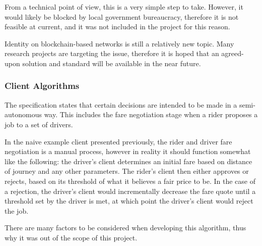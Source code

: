 From a technical point of view, this is a very simple step to take. However, it would likely be blocked by local government bureaucracy, therefore it is not feasible at current, and it was not included in the project for this reason.

Identity on blockchain-based networks is still a relatively new topic. Many research projects are targeting the issue, therefore it is hoped that an agreed-upon solution and standard will be available in the near future.

\subsubsection{Client Algorithms}

The specification states that certain decisions are intended to be made in a semi-autonomous way. This includes the fare negotiation stage when a rider proposes a job to a set of drivers.

In the naive example client presented previously, the rider and driver fare negotiation is a manual process, however in reality it should function somewhat like the following: the driver's client determines an initial fare based on distance of journey and any other parameters. The rider's client then either approves or rejects, based on its threshold of what it believes a fair price to be. In the case of a rejection, the driver's client would incrementally decrease the fare quote until a threshold set by the driver is met, at which point the driver's client would reject the job.

There are many factors to be considered when developing this algorithm, thus why it was out of the scope of this project.
